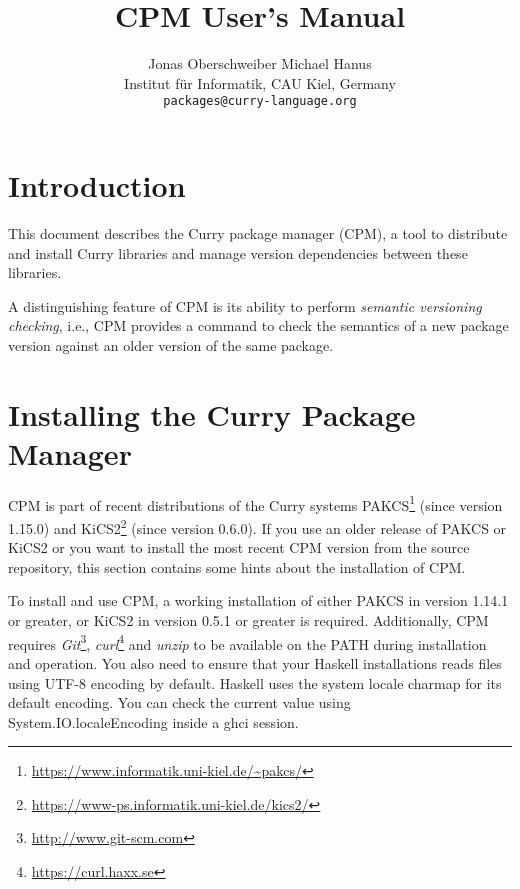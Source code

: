 \documentclass[11pt]{article}
\renewcommand{\tt}{\usefont{OT1}{cmtt}{m}{n}\selectfont}
\newcommand{\codefont}{\small\tt}
\newcommand{\code}[1]{\mbox{\codefont #1}}
\begin{document}
\title{CPM User's Manual}

\author{Jonas Oberschweiber \qquad Michael Hanus\\[1ex]
{\small Institut f\"ur Informatik, CAU Kiel, Germany}\\[1ex]
{\small\texttt{packages@curry-language.org}}
}

\maketitle

\tableofcontents

\clearpage


\section{Introduction}

This document describes the Curry package manager (CPM), a tool to
distribute and install Curry libraries and manage version dependencies
between these libraries.

A distinguishing feature of CPM is its ability to perform
\emph{semantic versioning checking}, i.e., CPM provides a command
to check the semantics of a new package version against an
older version of the same package.


\bigskip\bigskip

\section{Installing the Curry Package Manager}

CPM is part of recent distributions of the Curry systems
PAKCS\footnote{\url{https://www.informatik.uni-kiel.de/~pakcs/}}
(since version 1.15.0)
and
KiCS2\footnote{\url{https://www-ps.informatik.uni-kiel.de/kics2/}}
(since version 0.6.0).
If you use an older release of PAKCS or KiCS2 or you want to
install the most recent CPM version from the source repository,
this section contains some hints about the installation of CPM.

To install and use CPM, a working installation of either
PAKCS in version 1.14.1 or greater, or
KiCS2 in version 0.5.1 or greater is required. Additionally, CPM requires 
\emph{Git}\footnote{\url{http://www.git-scm.com}},
\emph{curl}\footnote{\url{https://curl.haxx.se}}
and \emph{unzip} to be available on the \code{PATH} during installation and 
operation. You also need to ensure that your Haskell installations reads files
using UTF-8 encoding by default. Haskell uses the system locale charmap for its
default encoding. You can check the current value using 
\code{System.IO.localeEncoding} inside a \code{ghci} session.
\end{document}
